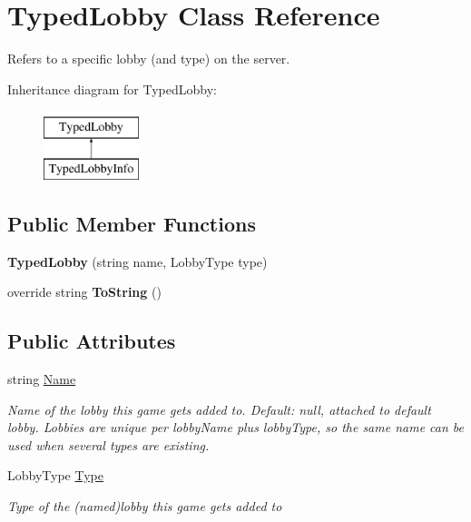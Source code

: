 \hypertarget{class_typed_lobby}{}\section{Typed\+Lobby Class Reference}
\label{class_typed_lobby}


Refers to a specific lobby (and type) on the server.  


Inheritance diagram for Typed\+Lobby\+:\begin{figure}[H]
\begin{center}
\leavevmode
\includegraphics[height=2.000000cm]{class_typed_lobby}
\end{center}
\end{figure}
\subsection*{Public Member Functions}
\begin{DoxyCompactItemize}
\item 
{\bfseries Typed\+Lobby} (string name, Lobby\+Type type)\hypertarget{class_typed_lobby_aa384f44e95a51cd7b7fd5cfc3354fde3}{}\label{class_typed_lobby_aa384f44e95a51cd7b7fd5cfc3354fde3}

\item 
override string {\bfseries To\+String} ()\hypertarget{class_typed_lobby_a7ba53ade2e4b461836a442872bdb5f71}{}\label{class_typed_lobby_a7ba53ade2e4b461836a442872bdb5f71}

\end{DoxyCompactItemize}
\subsection*{Public Attributes}
\begin{DoxyCompactItemize}
\item 
string \hyperlink{class_typed_lobby_acd1dfdf3ed901ee8ebe75587fcd0c60b}{Name}
\begin{DoxyCompactList}\small\item\em Name of the lobby this game gets added to. Default\+: null, attached to default lobby. Lobbies are unique per lobby\+Name plus lobby\+Type, so the same name can be used when several types are existing.\end{DoxyCompactList}\item 
Lobby\+Type \hyperlink{class_typed_lobby_a6f007dbaead56a950745524463ce5219}{Type}
\begin{DoxyCompactList}\small\item\em Type of the (named)lobby this game gets added to\end{DoxyCompactList}\end{DoxyCompactItemize}
